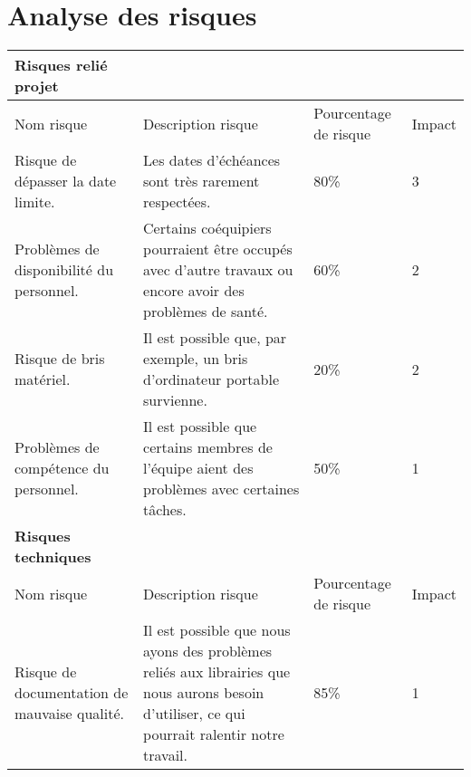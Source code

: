 \documentclass[10pt,a4paper]{report}
\begin{document}
\section*{Analyse des risques}
\begin{tabular}{| p{4cm} | p{5cm} | p{3cm} | p{2cm} |}
\hline
\textbf{Risques relié projet}&&&\\
\hline
Nom risque & Description risque & Pourcentage de risque & Impact\\
\hline
Risque de dépasser la date limite. & Les dates d'échéances sont très rarement respectées. & 80\% & 3\\
\hline
Problèmes de disponibilité du personnel. & Certains coéquipiers pourraient être occupés avec d'autre travaux ou encore avoir des problèmes de santé. & 60\% & 2\\
\hline
Risque de bris matériel. & Il est possible que, par exemple, un bris d'ordinateur portable survienne. & 20\% & 2\\
\hline
Problèmes de compétence du personnel. & Il est possible que certains membres de l'équipe aient des problèmes avec certaines tâches. & 50\% & 1\\
\hline
\hline
\textbf{Risques techniques}&&&\\
\hline
Nom risque & Description risque & Pourcentage de risque & Impact\\
\hline
Risque de documentation de mauvaise qualité. & Il est possible que nous ayons des problèmes reliés aux librairies que nous aurons besoin d'utiliser, ce qui pourrait ralentir notre travail. & 85\% & 1\\
\hline
\end{tabular}
\newpage


\end{document}

